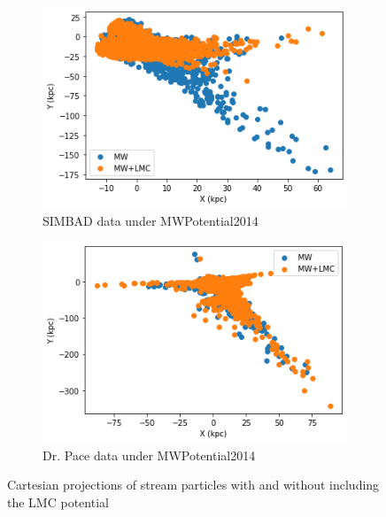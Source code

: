 \documentclass[12pt]{article}
\begin{document}
\begin{figure}[H]
\begin{subfigure}{.45\textwidth}
  \centering
  \includegraphics[width=\linewidth]{MWPot2014_wLMC_fn.png}
  \caption{SIMBAD data under MWPotential2014}
  \label{fig:2.1}
\end{subfigure}
\begin{subfigure}{.45\textwidth}
  \centering
  \includegraphics[width=\linewidth]{MWPot2014_wLMC_AP6D.png}
  \caption{Dr. Pace data under MWPotential2014}
  \label{fig:2.2}
\end{subfigure}

\caption{Cartesian projections of stream particles with and without including the LMC potential}
\label{fig:2}
\end{figure}
\end{document}
